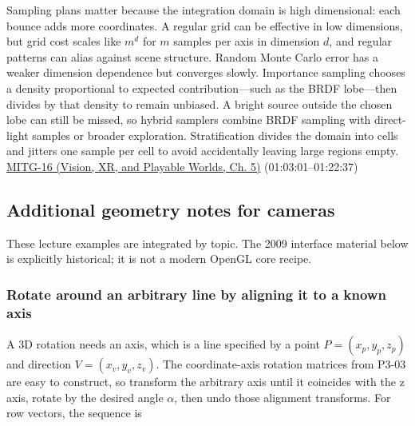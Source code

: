 Sampling plans matter because the integration domain is high dimensional: each bounce adds more coordinates. A regular grid can be effective in low dimensions, but grid cost scales like \(m^d\) for \(m\) samples per axis in dimension \(d\), and regular patterns can alias against scene structure. Random Monte Carlo error has a weaker dimension dependence but converges slowly. Importance sampling chooses a density proportional to expected contribution---such as the BRDF lobe---then divides by that density to remain unbiased. A bright source outside the chosen lobe can still be missed, so hybrid samplers combine BRDF sampling with direct-light samples or broader exploration. Stratification divides the domain into cells and jitters one sample per cell to avoid accidentally leaving large regions empty. \href{../07-Vision-XR-and-Playable-Worlds/main.pdf\#nameddest=04-visual-computing-ii-ch036-mitg-16---global-illumination}{MITG-16 (Vision, XR, and Playable Worlds, Ch. 5)} (01:03:01--01:22:37)

\subsection{Additional geometry notes for cameras}\label{03-visual-computing-i-ch011-additional-geometry-notes-for-cameras}

\hypertarget{03-visual-computing-i-ch011-additional-geometry-notes-for-cameras}{}

These lecture examples are integrated by topic. The 2009 interface material below is explicitly historical; it is not a modern OpenGL core recipe.

\subsubsection{Rotate around an arbitrary line by aligning it to a known axis}\label{03-visual-computing-i-ch011-rotate-around-an-arbitrary-line-by-aligning-it-to-a-known-axis}

\hypertarget{03-visual-computing-i-ch011-rotate-around-an-arbitrary-line-by-aligning-it-to-a-known-axis}{}

A 3D rotation needs an axis, which is a line specified by a point \(P=(x_p,y_p,z_p)\) and direction \(V=(x_v,y_v,z_v)\). The coordinate-axis rotation matrices from P3-03 are easy to construct, so transform the arbitrary axis until it coincides with the z axis, rotate by the desired angle \(\alpha\), then undo those alignment transforms. For row vectors, the sequence is


